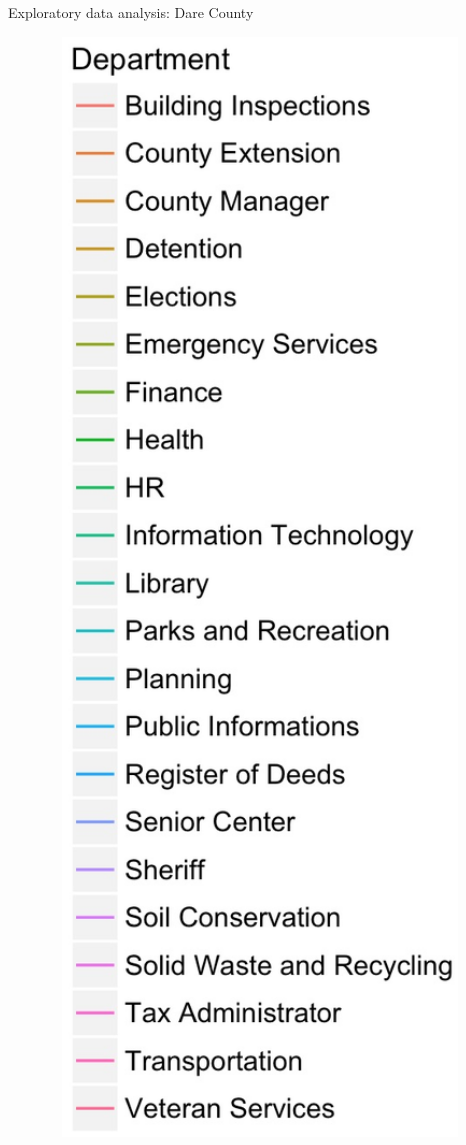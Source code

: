 \documentclass[10pt, xcolor=table]{beamer}
\theoremstyle{definition}
\theoremstyle{remark}
\begin{document}
\begin{frame}{Exploratory data analysis: Dare County}
\begin{minipage}{0.13\linewidth}
\begin{figure}
	 		 		 	\includegraphics[width=1.25\textwidth]{figures/Dept2.jpg}
	 \end{figure}	
	\end{minipage}
\end{frame}
\end{document}

